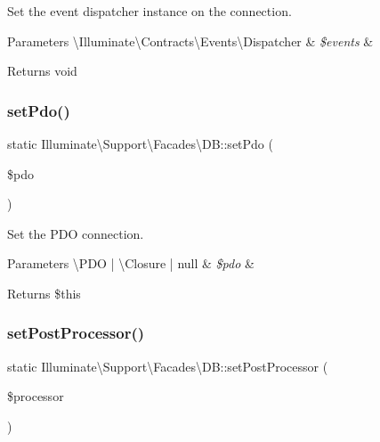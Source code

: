 Set the event dispatcher instance on the connection.


\begin{DoxyParams}[1]{Parameters}
\textbackslash{}\+Illuminate\textbackslash{}\+Contracts\textbackslash{}\+Events\textbackslash{}\+Dispatcher & {\em \$events} & \\
\hline
\end{DoxyParams}
\begin{DoxyReturn}{Returns}
void 
\end{DoxyReturn}
\mbox{\label{class_illuminate_1_1_support_1_1_facades_1_1_d_b_a8605551272521c40410a5d88c8cd859c}} 
\subsubsection{\texorpdfstring{set\+Pdo()}{setPdo()}}
{\footnotesize\ttfamily static Illuminate\textbackslash{}\+Support\textbackslash{}\+Facades\textbackslash{}\+D\+B\+::set\+Pdo (\begin{DoxyParamCaption}\item[{}]{\$pdo }\end{DoxyParamCaption})\hspace{0.3cm}{\ttfamily [static]}}

Set the P\+DO connection.


\begin{DoxyParams}[1]{Parameters}
\textbackslash{}\+P\+DO | \textbackslash{}\+Closure | null & {\em \$pdo} & \\
\hline
\end{DoxyParams}
\begin{DoxyReturn}{Returns}
\$this 
\end{DoxyReturn}
\mbox{\label{class_illuminate_1_1_support_1_1_facades_1_1_d_b_a48aba498dabc6974940c6714f14319fa}} 
\subsubsection{\texorpdfstring{set\+Post\+Processor()}{setPostProcessor()}}
{\footnotesize\ttfamily static Illuminate\textbackslash{}\+Support\textbackslash{}\+Facades\textbackslash{}\+D\+B\+::set\+Post\+Processor (\begin{DoxyParamCaption}\item[{}]{\$processor }\end{DoxyParamCaption})\hspace{0.3cm}{\ttfamily [static]}}

